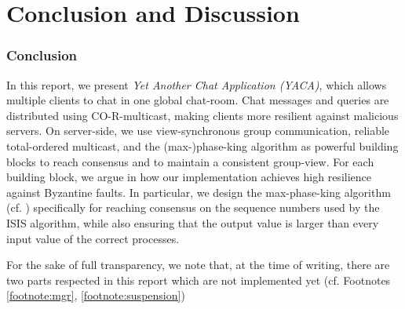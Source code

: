 \documentclass[runningheads]{llncs}
\begin{document}
\section{Conclusion and Discussion} \label{sec:conclusion}
\subsubsection{Conclusion}
In this report, we present \textit{Yet Another Chat Application (YACA)}, which allows multiple clients to chat in one global chat-room. Chat messages and queries are distributed using CO-R-multicast, making clients more resilient against malicious servers. On server-side, we use view-synchronous group communication, reliable total-ordered multicast, and the (max-)phase-king algorithm as powerful building blocks to reach consensus and to maintain a consistent group-view. For each building block, we argue in  how our implementation achieves high resilience against Byzantine faults. In particular, we design the max-phase-king algorithm (cf. ) specifically for reaching consensus on the sequence numbers used by the ISIS algorithm, while also ensuring that the output value is larger than every input value of the correct processes. 

For the sake of full transparency, we note that, at the time of writing, there are two parts respected in this report which are not implemented yet (cf. Footnotes \ref{footnote:mgr}, \ref{footnote:suspension})
\end{document}
